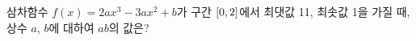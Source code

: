 삼차함수 $f(x)=2ax^3-3ax^2+b$가 구간 $[0{,}\mkern3mu\mathopen{}2]$에서 최댓값 11, 최솟값 1을 가질 때, 상수 $a$, $b$에 대하여 $ab$의 값은? 
